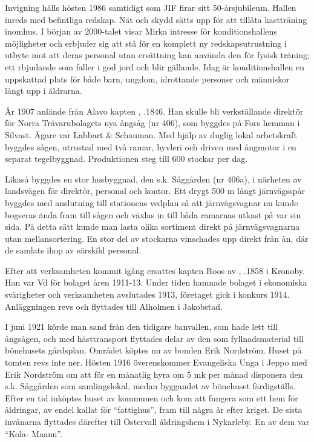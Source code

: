 Invigning hålls hösten 1986 samtidigt som JIF firar sitt 50-årsjubileum. Hallen inreds med befintliga redskap. Nät och skydd sätts upp för att tillåta kastträning inomhus. I början av 2000-talet visar Mirka intresse för konditionshallens möjligheter och erbjuder sig att stå för en komplett ny redskapsutrustning i utbyte mot att deras personal utan ersättning kan använda den för fysisk träning; ett rbjudande som faller i god jord och blir gällande. Idag är konditionshallen en uppskattad plats för både barn, ungdom, idrottande personer och människor långt upp i åldrarna.



%

\jhnooccupant

År 1907 anlände från Alavo kapten , .1846. Han skulle bli verkställande direktör för Norra Trävarubolagets nya ångsåg (nr 406), som byggdes på Fors hemman i Silvast. Ägare var Labbart \& Schauman. Med hjälp av duglig lokal arbetskraft byggdes sågen, utrustad med två ramar, hyvleri och driven med ångmotor i en separat tegelbyggnad. Produktionen steg till 600 stockar per dag.

Likaså byggdes en stor husbyggnad, den s.k. Såggården (nr 406a), i närheten av landsvägen för direktör, personal och kontor. Ett drygt 500 m långt järnvägsspår byggdes med anslutning till stationens vedplan så att järnvägsvagnar nu kunde bogseras ända fram till sågen och växlas in till båda ramarnas utkast på var sin sida. På detta sätt kunde man lasta olika sortiment direkt på järnvägsvagnarna utan mellansortering. En stor del av stockarna vinschades upp direkt från ån, där de samlats ihop av särskild personal.



Efter att verksamheten kommit igång ersattes kapten Roos av , .1858 i Kronoby. Han var Vd för bolaget åren 1911-13. Under tiden hamnade bolaget i ekonomiska svårigheter och verksamheten avslutades 1913, företaget gick i konkurs 1914. Anläggningen revs och flyttades till Alholmen i Jakobstad.

I juni 1921 körde man sand från den tidigare banvallen, som hade lett till ångsågen, och med hästtransport flyttades delar av den som fyllnadsmaterial till bönehusets gårdsplan. Området köptes nu av bonden Erik Nordström. Huset på tomten revs inte ner. Hösten 1916 överenskommer Evangeliska Unga i Jeppo med Erik Nordström  om att för en månatlig hyra om 5 mk per månad disponera den s.k. Såggården som samlingslokal, medan byggandet av bönehuset färdigställs. Efter en tid inköptes huset av kommunen och kom att fungera som ett hem för åldringar, av endel kallat för ``fattighus'', fram till några år efter kriget. De sista invånarna flyttades därefter till Östervall åldringshem i Nykarleby. En av dem var ``Kola- Maanu''.

